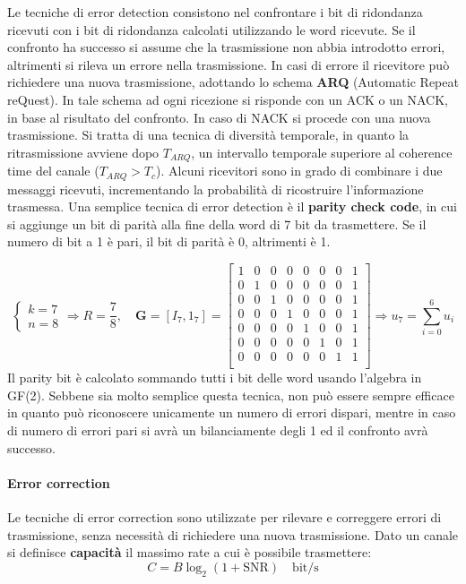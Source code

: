 Le tecniche di error detection consistono nel confrontare i bit di ridondanza ricevuti con i bit di ridondanza calcolati utilizzando le word ricevute. 
Se il confronto ha successo si assume che la trasmissione non abbia introdotto errori, altrimenti si rileva un errore nella trasmissione.
In casi di errore il ricevitore può richiedere una nuova trasmissione, adottando lo schema \textbf{ARQ} (Automatic Repeat reQuest).
In tale schema ad ogni ricezione si risponde con un ACK o un NACK, in base al risultato del confronto.
In caso di NACK si procede con una nuova trasmissione. 
Si tratta di una tecnica di diversità temporale, in quanto la ritrasmissione avviene dopo $T_{ARQ}$, un intervallo temporale superiore al coherence time del canale ($T_{ARQ} > T_c$).
Alcuni ricevitori sono in grado di combinare i due messaggi ricevuti, incrementando la probabilità di ricostruire l'informazione trasmessa.
Una semplice tecnica di error detection è il \textbf{parity check code}, in cui si aggiunge un bit di parità alla fine della word di 7 bit da trasmettere. Se il numero di bit a 1 è pari, il bit di parità è 0, altrimenti è 1.

\[
    \begin{cases}
        k = 7 \\
        n = 8 
    \end{cases}
    \Rightarrow R = \frac{7}{8},
    \quad \mathbf{G} = \left[I_7, 1_7\right] = 
    \begin{bmatrix}
        1 & 0 & 0 & 0 & 0 & 0 & 0 & 1 \\
        0 & 1 & 0 & 0 & 0 & 0 & 0 & 1 \\
        0 & 0 & 1 & 0 & 0 & 0 & 0 & 1 \\
        0 & 0 & 0 & 1 & 0 & 0 & 0 & 1 \\
        0 & 0 & 0 & 0 & 1 & 0 & 0 & 1 \\
        0 & 0 & 0 & 0 & 0 & 1 & 0 & 1 \\
        0 & 0 & 0 & 0 & 0 & 0 & 1 & 1 \\
    \end{bmatrix}
    \Rightarrow u_7 = \sum_{i=0}^{6} u_i
\]
Il parity bit è calcolato sommando tutti i bit delle word usando l'algebra in GF(2).
Sebbene sia molto semplice questa tecnica, non può essere sempre efficace in quanto può riconoscere unicamente un numero di errori dispari, mentre in caso di numero di errori pari si avrà un bilanciamente degli 1 ed il confronto avrà successo.

\paragraph*{Error correction}
Le tecniche di error correction sono utilizzate per rilevare e correggere errori di trasmissione, senza necessità di richiedere una nuova trasmissione.
Dato un canale si definisce \textbf{capacità} il massimo rate a cui è possibile trasmettere:
\[
    C = B \log_2(1 + \text{SNR}) \quad \text{bit/s}
\]

